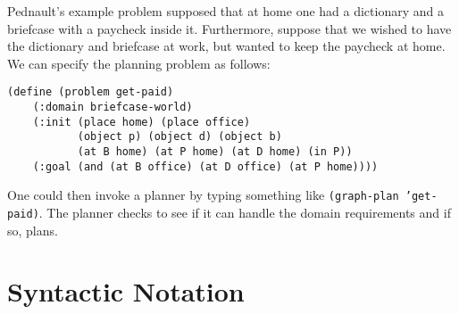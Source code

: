 Pednault's example problem supposed that at home one had a dictionary and a
briefcase with a paycheck inside it.  Furthermore, suppose that we wished
to have the dictionary and briefcase at work, but wanted to keep the
paycheck at home.  We can specify the planning problem as follows: 

\begin{verbatim}
(define (problem get-paid)       
    (:domain briefcase-world)
    (:init (place home) (place office) 
           (object p) (object d) (object b)
           (at B home) (at P home) (at D home) (in P))
    (:goal (and (at B office) (at D office) (at P home))))
\end{verbatim}

One could then invoke a planner by typing something like {\tt (graph-plan
'get-paid)}. The planner checks to see if it can handle the domain
requirements and if so, plans. 

\section{Syntactic Notation}

